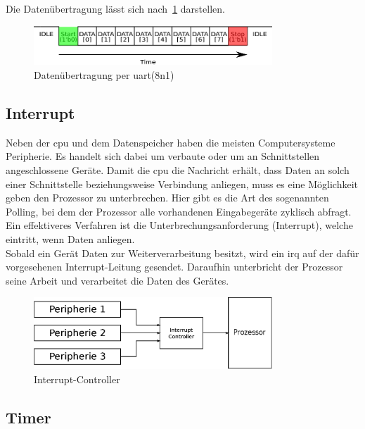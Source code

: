 Die Datenübertragung lässt sich nach~\ref{fig:uart} darstellen.\\

\begin{figure}[h!]
\centering
\includegraphics[width=0.8\textwidth]{Hauptteil/uart.eps}
\caption{Datenübertragung per \ac{uart}(8n1) }
\label{fig:uart}
\end{figure}


\subsection{Interrupt}\label{kap:interrupt}
Neben der \ac{cpu} und dem Datenspeicher haben die meisten Computersysteme Peripherie. Es handelt sich dabei um verbaute oder um an Schnittstellen angeschlossene Geräte.
Damit die \ac{cpu} die Nachricht erhält, dass Daten an solch einer Schnittstelle beziehungsweise Verbindung anliegen, muss es eine Möglichkeit geben den Prozessor zu
unterbrechen. Hier gibt es die Art des sogenannten Polling, bei dem der Prozessor alle vorhandenen Eingabegeräte zyklisch abfragt. Ein effektiveres Verfahren ist die
Unterbrechungsanforderung (Interrupt), welche eintritt, wenn Daten anliegen. \\
Sobald ein Gerät Daten zur Weiterverarbeitung besitzt, wird ein \ac{irq} auf der dafür vorgesehenen Interrupt-Leitung gesendet. Daraufhin unterbricht der Prozessor
seine Arbeit und verarbeitet die Daten des Gerätes.\cite{irq}\\

\begin{figure}[H]
\centering
\includegraphics[width=0.8\textwidth]{Hauptteil/irq.eps}
\caption{Interrupt-Controller}\label{fig:irq}
\end{figure}

\subsection{Timer}\label{kap:timer}

